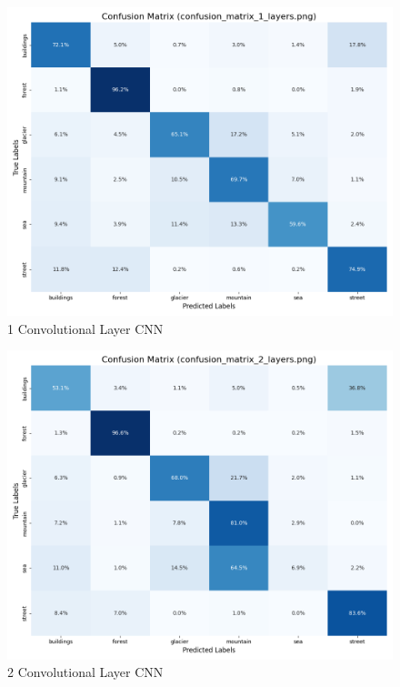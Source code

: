 \documentclass[conference]{IEEEtran}
\begin{document}
\begin{figure}[ht]
    \centering
    \includegraphics[width=\linewidth]{img/confusion_matrix_1_layers.png}
    \caption{1 Convolutional Layer CNN}
    \label{fig:sub1}
\end{figure}

\begin{figure}[ht]
    \centering
    \includegraphics[width=\linewidth]{img/confusion_matrix_2_layers.png}
    \caption{2 Convolutional Layer CNN}
    \label{fig:sub2}
\end{figure}
\end{document}
